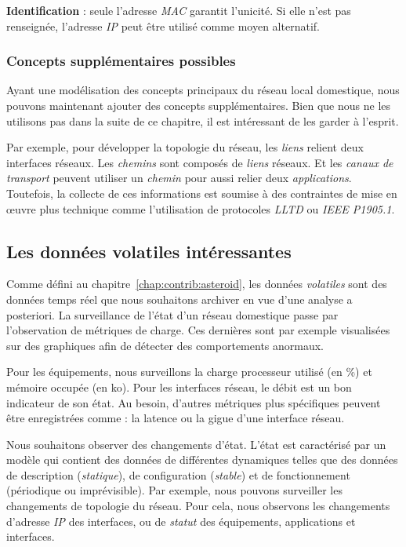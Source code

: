 \textbf{Identification} : seule l'adresse \textit{MAC} garantit l'unicité. Si elle n'est pas renseignée, l'adresse \textit{IP} peut être utilisé comme moyen alternatif.

\subsubsection{Concepts supplémentaires possibles}
Ayant une modélisation des concepts principaux du réseau local domestique, nous pouvons maintenant ajouter des concepts supplémentaires. Bien que nous ne les utilisons pas dans la suite de ce chapitre, il est intéressant de les garder à l'esprit.

Par exemple, pour développer la topologie du réseau, les \textit{liens} relient deux interfaces réseaux. Les \textit{chemins} sont composés de \textit{liens} réseaux. Et les \textit{canaux de transport} peuvent utiliser un \textit{chemin} pour aussi relier deux \textit{applications}. Toutefois, la collecte de ces informations est soumise à des contraintes de mise en œuvre plus technique comme l'utilisation de protocoles \textit{LLTD} ou \textit{IEEE P1905.1}.

\subsection{Les données volatiles intéressantes}
Comme défini au chapitre~\ref{chap:contrib:asteroid}, les données \textit{volatiles} sont des données temps réel que nous souhaitons archiver en vue d'une analyse a posteriori. La surveillance de l'état d'un réseau domestique passe par l'observation de métriques de charge. Ces dernières sont par exemple visualisées sur des graphiques afin de détecter des comportements anormaux.

Pour les équipements, nous surveillons la charge processeur utilisé (en \%) et mémoire occupée (en ko). Pour les interfaces réseau, le débit est un bon indicateur de son état. Au besoin, d'autres métriques plus spécifiques peuvent être enregistrées comme : la latence ou la gigue d'une interface réseau.

Nous souhaitons observer des changements d'état. L'état est caractérisé par un modèle qui contient des données de différentes dynamiques telles que des données de description (\textit{statique}), de configuration (\textit{stable}) et de fonctionnement (périodique ou imprévisible). Par exemple, nous pouvons surveiller les changements de topologie du réseau. Pour cela, nous observons les changements d'adresse \textit{IP} des interfaces, ou de \textit{statut} des équipements, applications et interfaces.

